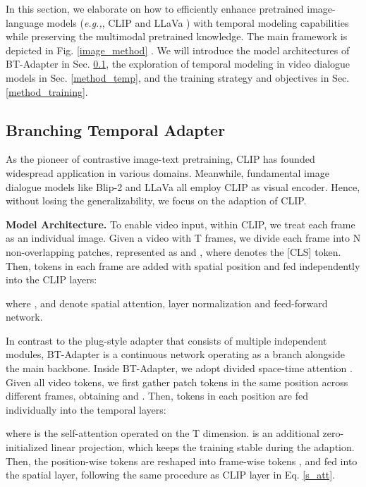 \documentclass{article} \usepackage{iclr2024_conference,times}
\begin{document}
In this section, we elaborate on how to efficiently enhance pretrained image-language models (\textit{e.g.,}, CLIP \citep{radford2021learning} and LLaVa \citep{liu2023visual}) with temporal modeling capabilities while preserving the multimodal pretrained knowledge. The main framework is depicted in Fig. \ref{image_method} . We will introduce the model architectures of BT-Adapter in Sec. \ref{method_arch}, the exploration of temporal modeling in video dialogue models in Sec. \ref{method_temp}, and the training strategy and objectives in Sec. \ref{method_training}.

\vspace{-0.5em}

\subsection{Branching Temporal Adapter} \label{method_arch}

\vspace{-0.5em}

As the pioneer of contrastive image-text pretraining, CLIP \citep{radford2021learning} has founded widespread application in various domains. Meanwhile, fundamental image dialogue models like Blip-2 \citep{li2023blip} and LLaVa \citep{liu2023visual} all employ CLIP as visual encoder. Hence, without losing the generalizability, we focus on the adaption of CLIP.

\noindent \textbf{Model Architecture.} 
To enable video input, within CLIP, we treat each frame as an individual image. Given a video with T frames, we divide each frame into N non-overlapping patches, represented as  and , where  denotes the [CLS] token. Then, tokens in each frame are added with spatial position and fed independently into the  CLIP layers:

where ,  and  denote spatial attention, layer normalization and feed-forward network.

In contrast to the plug-style adapter that consists of multiple independent modules, BT-Adapter is a continuous network operating as a branch alongside the main backbone. Inside BT-Adapter, we adopt divided space-time attention \citep{bertasius2021space}. Given all video tokens, we first gather patch tokens in the same position across different frames, obtaining  and . Then, tokens in each position are fed individually into the  temporal layers:

where  is the self-attention operated on the T dimension.  is an additional zero-initialized linear projection, which keeps the training stable during the adaption. Then, the position-wise tokens are reshaped into frame-wise tokens , and fed into the spatial layer, following the same procedure as CLIP layer in Eq. \ref{s_att}.
\end{document}

